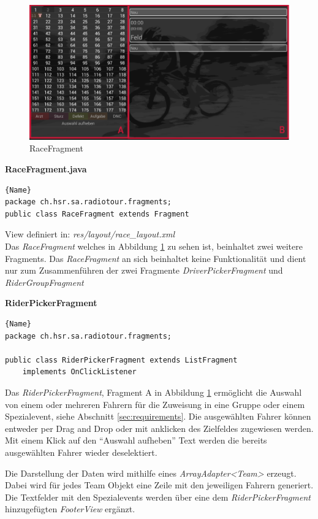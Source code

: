 \begin{figure}[h!]
\caption{RaceFragment}
\label{fig:racefragment}
\centering
\includegraphics[scale=0.8]{07anhang/images/dev_racefragment.png}
\end{figure}


\textbf{RaceFragment.java}
\begin{lstlisting}{Name}
package ch.hsr.sa.radiotour.fragments;
public class RaceFragment extends Fragment 
\end{lstlisting}


View definiert in:
\textit{res/layout/race\_layout.xml}
\\
Das \textit{RaceFragment} welches in Abbildung \ref{fig:racefragment} zu sehen ist, beinhaltet zwei weitere Fragments. Das \textit{RaceFragment} an sich beinhaltet keine Funktionalität und dient nur zum Zusammenführen der zwei Fragmente \textit{DriverPickerFragment} und \textit{RiderGroupFragment}

\textbf{RiderPickerFragment}
\begin{lstlisting}{Name}
package ch.hsr.sa.radiotour.fragments;

public class RiderPickerFragment extends ListFragment
	implements OnClickListener
\end{lstlisting}

Das \textit{RiderPickerFragment}, Fragment A in Abbildung \ref{fig:racefragment} ermöglicht die Auswahl von einem oder mehreren Fahrern für die Zuweisung in eine Gruppe oder einem Spezialevent, siehe Abschnitt \ref{sec:requirements}. Die ausgewählten Fahrer können entweder per Drag and Drop oder mit anklicken des Zielfeldes zugewiesen werden. Mit einem Klick auf den "`Auswahl aufheben"' Text werden die bereits ausgewählten Fahrer wieder deselektiert.

Die Darstellung der Daten wird mithilfe eines \textit{ArrayAdapter<Team>} erzeugt. Dabei wird für jedes Team Objekt eine Zeile mit den jeweiligen Fahrern generiert. Die Textfelder mit den Spezialevents werden über eine dem \textit{RiderPickerFragment} hinzugefügten \textit{FooterView} ergänzt.

